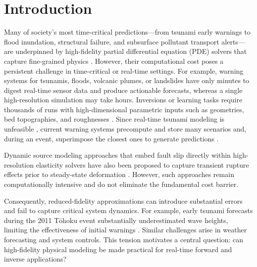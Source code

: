 \section{Introduction}

Many of society’s most time-critical predictions—from tsunami early warnings to flood inundation, structural failure, and subsurface pollutant transport alerts—are underpinned by high-fidelity partial differential equation (PDE) solvers that capture fine-grained physics \citep{leveque2002finite,palais2009differential, quarteroni2010numerical}. However, their computational cost poses a persistent challenge in time-critical or real-time settings. For example, warning systems for tsunamis, floods, volcanic plumes, or landslides have only minutes to digest real-time sensor data and produce actionable forecasts, whereas a single high-resolution simulation may take hours. Inversions or learning tasks require thousands of runs \citep{li2021fourier} with high-dimensional parametric inputs such as geometries, bed topographies, and roughnesses \citep{grady2023model, xiao2024fourier}. Since real-time tsunami modeling is unfeasible \citep{Reymond2012}, current warning systems precompute and store many scenarios and, during an event, superimpose the closest ones to generate predictions \citep{gica2008development, fujita2024scenario}.

Dynamic source modeling approaches that embed fault slip directly within high-resolution elasticity solvers have also been proposed to capture transient rupture effects prior to steady-state deformation \citep{vogl2017high}. However, such approaches remain computationally intensive and do not eliminate the fundamental cost barrier.

Consequently, reduced-fidelity approximations can introduce substantial errors and fail to capture critical system dynamics. For example, early tsunami forecasts during the 2011 Tōhoku event substantially underestimated wave heights, limiting the effectiveness of initial warnings \citep{hoshiba2014earthquake, ozaki2012jma}. Similar challenges arise in weather forecasting and system controls. This tension motivates a central question: can high-fidelity physical modeling be made practical for real-time forward and inverse applications?

